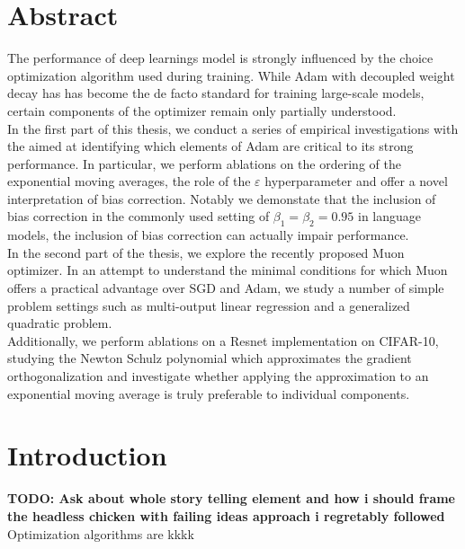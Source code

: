 \documentclass[12pt]{book}
\newcommand{\todo}[1]{{\color{red}\bf{TODO: #1}}}
\begin{document}
\chapter{Abstract}
The performance of deep learnings model is strongly influenced by the choice optimization algorithm used during training. While Adam with decoupled weight decay has has become the de facto standard for training large-scale models, certain components of the optimizer remain only partially understood. \\
In the first part of this thesis, we conduct a series of empirical investigations with the aimed at identifying which elements of Adam are critical to its strong performance. In particular, we perform ablations on the ordering of the exponential moving averages, the role of the  $\varepsilon $ hyperparameter and offer a novel interpretation of bias correction. Notably we demonstate that the inclusion of bias correction in the commonly used setting of $\beta_1 = \beta_2 = 0.95$ in language models, the inclusion of bias correction can actually impair performance. 
\\
In the second part of the thesis, we explore the recently proposed Muon optimizer. In an attempt to understand the minimal conditions for which Muon offers a practical advantage over SGD and Adam, we study a number of simple problem settings such as multi-output linear regression and a generalized quadratic problem.   \\
Additionally, we perform ablations on a Resnet implementation on CIFAR-10, studying the Newton Schulz polynomial which approximates the gradient orthogonalization and investigate whether applying the approximation to an exponential moving average is truly preferable to individual components.

\chapter{Introduction}
\todo{Ask about whole story telling element and how i should frame the headless chicken with failing ideas approach i regretably followed}
Optimization algorithms are kkkk
\end{document}
